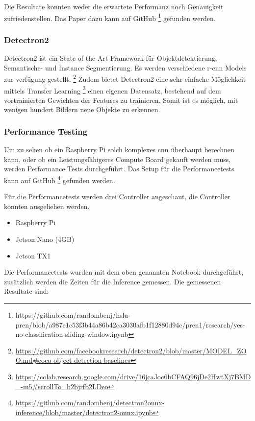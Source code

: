 Die Resultate konnten weder die erwartete Performanz noch Genauigkeit zufriedenstellen.
Das Paper dazu kann auf GitHub \footnote{
https://github.com/randombenj/hslu-pren/blob/a987e1c53f3b44a86b42ca3030afb1f12880d94c/pren1/research/yes-no-classification-sliding-window.ipynb} gefunden werden.


\subsubsection{Detectron2}

Detectron2 \cite{wu2019detectron2} ist ein State of the Art Framework für Objektdetektierung, Semantische- und Instance Segmentierung.
Es werden verschiedene \acrshort{r-cnn} Models zur verfügung gestellt. \footnote{
\url{https://github.com/facebookresearch/detectron2/blob/master/MODEL_ZOO.md#coco-object-detection-baselines}
}
Zudem bietet Detectron2 eine sehr einfache Möglichkeit mittels Transfer Learning \footnote{
\url{https://colab.research.google.com/drive/16jcaJoc6bCFAQ96jDe2HwtXj7BMD_-m5#scrollTo=b2bjrfb2LDeo}
}
einen eigenen Datensatz, bestehend auf dem vortrainierten Gewichten der Features zu trainieren.
Somit ist es möglich, mit wenigen hundert Bildern neue Objekte zu erkennen.

\subsubsection{Performance Testing}

Um zu sehen ob ein Raspberry Pi solch komplexes \acrshort{cnn} überhaupt berechnen kann, oder ob ein
Leistungsfähigeres Compute Board gekauft werden muss, werden Performance Tests durchgeführt.
Das Setup für die Performancetests kann auf GitHub \footnote{\url{https://github.com/randombenj/detectron2onnx-inference/blob/master/detectron2-onnx.ipynb}} gefunden werden.

Für die Performancetests werden drei Controller angeschaut, die Controller konnten ausgeliehen werden.

\begin{itemize}
    \item Raspberry Pi
    \item Jetson Nano (4GB)
    \item Jetson TX1
\end{itemize}


Die Performancetests wurden mit dem oben genannten Notebook durchgeführt, zusätzlich werden die Zeiten für die
Inference gemessen. Die gemessenen Resultate sind:

